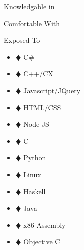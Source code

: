 \documentclass{article}
\newcommand{\lineseparator}[1]{\noindent\makebox[\linewidth]{\rule{\textwidth}{#1}}}
\begin{document}
\begin{minipage}[t]{0.33\textwidth}
  {\Large Knowledgable in }\\ 
\end{minipage}
\begin{minipage}[t]{0.33\textwidth}
  {\Large Comfortable With }\\ 
\end{minipage}
\begin{minipage}[t]{0.34\textwidth}
  {\Large Exposed To }\\ 
\end{minipage}
\lineseparator{0.5pt}
\begin{minipage}[t]{0.33\textwidth}
  \vspace{0.5mm}
  \begin {itemize}
    \item[$\vardiamond$] C\# 
    \item[$\vardiamond$] C++/CX 
    \item[$\vardiamond$] Javascript/JQuery 
    \item[$\vardiamond$] HTML/CSS 
  \end{itemize}
\end{minipage}
\begin{minipage}[t]{0.33\textwidth}
  \vspace{0.5mm}
  \begin {itemize}
    \item[$\vardiamond$] Node JS 
    \item[$\vardiamond$] C 
    \item[$\vardiamond$] Python 
    \item[$\vardiamond$] Linux
  \end{itemize}
\end{minipage}
\begin{minipage}[t]{0.34\textwidth}
  \vspace{0.5mm}
  \begin {itemize}
    \item[$\vardiamond$] Haskell 
    \item[$\vardiamond$] Java 
    \item[$\vardiamond$] x86 Assembly 
    \item[$\vardiamond$] Objective C 
  \end{itemize}
\end{minipage}
\end{document}
